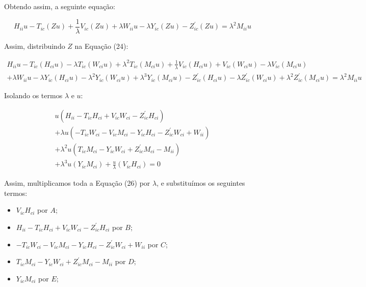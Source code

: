 \documentclass[a4paper,12p]{article}
\begin{document}
	Obtendo assim, a seguinte equação:
	
	\begin{equation}
						H_{ii} u 
	- 					T_{ic}(Z u) 
	+ \frac{1}{\lambda} V_{ic}(Z u) 
	+ 		   \lambda  W_{ii} u 
	-          \lambda  Y_{ic}(Z u)
	- 					Z^{'}_{ic}(Z u)
	= \lambda^{2} M_{ii} u
	\end{equation}
	
	Assim, distribuindo $Z$ na Equação (24):
	
	\begin{equation}
	\begin{gathered}
	H_{ii} u 
	- 					   T_{ic}(H_{ci} u) 
	- 		   \lambda 	   T_{ic}(W_{ci} u) 
	+ 		   \lambda^{2} T_{ic}(M_{ci} u) 
	+ \frac{1}{\lambda}    V_{ic}(H_{ci} u) 
	+				       V_{ic}(W_{ci} u) 
	- 		   \lambda     V_{ic}(M_{ci} u) 
	\\
	+ 		   \lambda     W_{ii} u 
	-          \lambda     Y_{ic}(H_{ci} u)
	-          \lambda^{2} Y_{ic}(W_{ci} u)
	+          \lambda^{3} Y_{ic}(M_{ci} u)
	- 				       Z^{'}_{ic}(H_{ci} u)
	- 		   \lambda	   Z^{'}_{ic}(W_{ci} u)
	+ 		   \lambda^{2} Z^{'}_{ic}(M_{ci} u)
	= 		   \lambda^{2} M_{ii} u
	\end{gathered}
	\end{equation}
	
	Isolando os termos $\lambda$ e $u$:
	
	\begin{equation}
	\begin{gathered}
	u (H_{ii}  -  T_{ic} H_{ci}  +  V_{ic} W_{ci}  -  Z^{'}_{ic} H_{ci})
	\\
	+ \lambda u (-T_{ic} W_{ci}  -V_{ic} M_{ci}  -Y_{ic} H_{ci}  -Z^{'}_{ic} W_{ci}  +W_{ii})
	\\
	+ \lambda^{2} u (T_{ic} M_{ci}  -Y_{ic} W_{ci}  +Z^{'}_{ic} M_{ci}  -M_{ii})
	\\
	+ \lambda^{3} u (Y_{ic} M_{ci})
	+ \frac{u}{\lambda} (V_{ic} H_{ci})
	=
	0
	\end{gathered}
	\end{equation}
	
	Assim, multiplicamos toda a Equação (26) por $\lambda$, e substituímos os seguintes termos:
	
	\begin{itemize}
		\item $V_{ic} H_{ci}$ por $A$;
		\item $H_{ii}-T_{ic} H_{ci}+V_{ic} W_{ci}-Z^{'}_{ic} H_{ci}$ por $B$;
		\item $-T_{ic} W_{ci}-V_{ic} M_{ci}-Y_{ic} H_{ci}-Z^{'}_{ic} W_{ci}+W_{ii}$ por $C$;
		\item $T_{ic} M_{ci}-Y_{ic} W_{ci}+Z^{'}_{ic} M_{ci}-M_{ii}$ por $D$;
		\item $Y_{ic} M_{ci}$ por $E$;
	\end{itemize}
	
\end{document}
